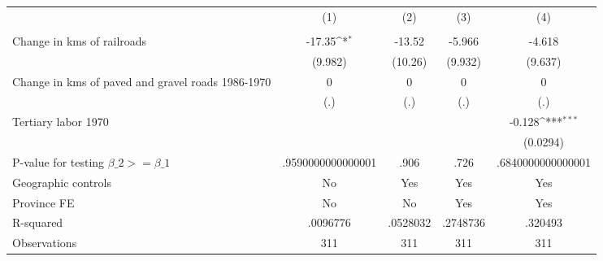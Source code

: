 {
\def\sym#1{\ifmmode^{#1}\else\(^{#1}\)\fi}
\begin{tabular}{l*{4}{c}}
\hline\hline
                &\multicolumn{1}{c}{(1)}&\multicolumn{1}{c}{(2)}&\multicolumn{1}{c}{(3)}&\multicolumn{1}{c}{(4)}\\
                &\multicolumn{1}{c}{}&\multicolumn{1}{c}{}&\multicolumn{1}{c}{}&\multicolumn{1}{c}{}\\
\hline
Change in kms of railroads&   -17.35\sym{*}  &   -13.52         &   -5.966         &   -4.618         \\
                &  (9.982)         &  (10.26)         &  (9.932)         &  (9.637)         \\
[1em]
Change in kms of paved and gravel roads 1986-1970&        0         &        0         &        0         &        0         \\
                &      (.)         &      (.)         &      (.)         &      (.)         \\
[1em]
Tertiary labor 1970&                  &                  &                  &   -0.128\sym{***}\\
                &                  &                  &                  & (0.0294)         \\
\hline
P-value for testing $\beta\_{2} >= \beta\_{1}$&.9590000000000001         &     .906         &     .726         &.6840000000000001         \\
Geographic controls&       No         &      Yes         &      Yes         &      Yes         \\
Province FE     &       No         &       No         &      Yes         &      Yes         \\
R-squared       & .0096776         & .0528032         & .2748736         &  .320493         \\
Observations    &      311         &      311         &      311         &      311         \\
\hline\hline
\end{tabular}
}
